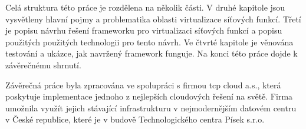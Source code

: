 Celá struktura této práce je rozdělena na několik části. V druhé kapitole jsou vysvětleny hlavní pojmy a problematika oblasti virtualizace síťových funkcí. Třetí je popisu návrhu řešení frameworku pro virtualizaci síťových funkcí a popisu použitých použitých technologii pro tento návrh. Ve čtvrté kapitole je věnována testování a ukázce, jak navržený framework funguje. Na konci této práce dojde k závěrečnému shrnutí.

Závěrečná práce byla zpracována ve spolupráci s firmou tcp cloud a.s., která poskytuje implementace jednoho z nejlepších cloudových řešení na světě. Firma umožnila využít jejich stávající infrastrukturu v nejmodernějším datovém centru v České republice, které je v budově Technologického centra Písek s.r.o.



